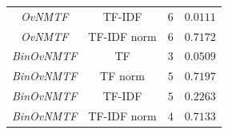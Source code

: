 \documentclass[
    12pt,                %
    oneside,            %
    a4paper,            %
    english,            %
    brazil                %
    ]{abntex2ppgsi}
\begin{document}
\begin{table}[H]
\begin{tabular}{c|c|c|c}
            \textit{OvNMTF}        & TF-IDF        & $6$ & $0.0111$            \\
            \textit{OvNMTF}        & TF-IDF norm   & $6$ & $0.7172$            \\
            \hline
            \textit{BinOvNMTF}     & TF            & $3$ & $0.0509$            \\
            \textit{BinOvNMTF}     & TF norm       & $5$ & $0.7197$            \\
            \textit{BinOvNMTF}     & TF-IDF        & $5$ & $0.2263$            \\
            \textit{BinOvNMTF}     & TF-IDF norm   & $4$ & $0.7133$            \\
            \hline
        \end{tabular}
    \label{tab:experiments-quant:igtoy}
\end{table}





\end{document}
